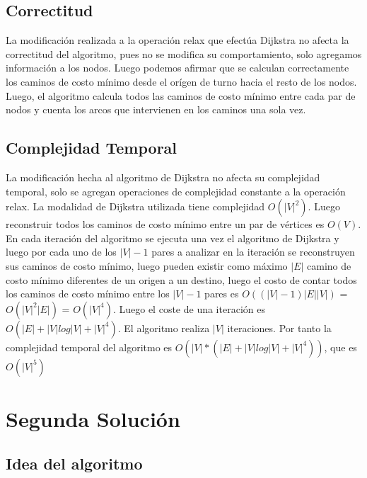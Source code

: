 \documentclass[article]{llncs}
\begin{document}
\subsection{Correctitud}

La modificaci\'on realizada a la operaci\'on relax que efect\'ua Dijkstra no afecta la correctitud 
del algoritmo, pues no se modifica su comportamiento, solo agregamos informaci\'on a los nodos. Luego 
podemos afirmar que se calculan correctamente los caminos de costo m\'inimo desde el or\'igen de turno 
hacia el resto de los nodos. Luego, el algoritmo calcula todos las caminos de costo m\'inimo entre cada 
par de nodos y cuenta los arcos que intervienen en los caminos una sola vez. 

\subsection{Complejidad Temporal}

La modificaci\'on hecha al algoritmo de Dijkstra no afecta su complejidad temporal, solo se agregan operaciones de complejidad 
constante a la operaci\'on relax.
La modalidad de Dijkstra utilizada tiene complejidad $O(|V|^2)$. Luego reconstruir todos los caminos de costo m\'inimo 
entre un par de v\'ertices es $O(V)$. En cada iteraci\'on del algoritmo se ejecuta una vez el algoritmo 
de Dijkstra y luego por cada uno de los $|V| - 1$ pares a analizar en la iteraci\'on se reconstruyen sus 
caminos de costo m\'inimo, luego pueden existir como m\'aximo $|E|$ camino de costo m\'inimo diferentes 
de un origen a un destino, luego el costo de contar todos los caminos de costo m\'inimo entre los $|V| - 1$
pares es $O((|V|-1)|E||V|)$ = $O(|V|^2|E|)$ = $O(|V|^4)$. Luego el coste de una iteraci\'on es $O(|E| + |V|log|V| + |V|^4)$. 
El algoritmo realiza $|V|$ iteraciones. Por tanto la complejidad temporal del algoritmo es $O(|V|*(|E| + |V|log|V| + |V|^4))$, 
que es $O(|V|^5)$

\section{Segunda Solución}

\subsection{Idea del algoritmo}
\end{document}
